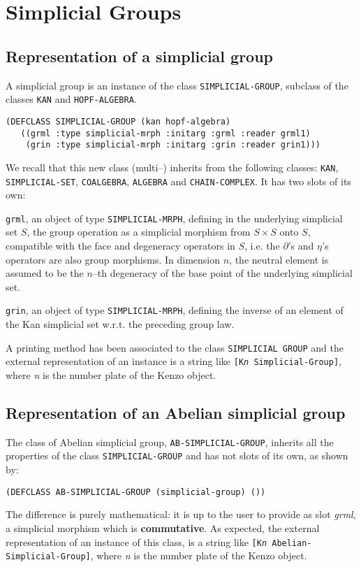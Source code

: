 \chapter {Simplicial Groups}

\section {Representation of a  simplicial group}

A simplicial group is  an instance 
of the class {\tt SIMPLICIAL-GROUP}, subclass of the classes {\tt KAN} and {\tt HOPF-ALGEBRA}.
{\footnotesize\begin{verbatim}
(DEFCLASS SIMPLICIAL-GROUP (kan hopf-algebra)
   ((grml :type simplicial-mrph :initarg :grml :reader grml1)
    (grin :type simplicial-mrph :initarg :grin :reader grin1)))
\end{verbatim}}
We recall that this new class (multi--) inherits  from the following classes:
{\tt KAN}, {\tt SIMPLICIAL-SET}, {\tt COALGEBRA},  {\tt ALGEBRA} and {\tt CHAIN-COMPLEX}.
It has two slots of its own:
\begin{description}
\item {\tt grml}, an object of type {\tt SIMPLICIAL-MRPH}, defining in the underlying simplicial set $S$, 
the group operation  as a simplicial morphism from $S \times S$ onto $S$,  
compatible with the face and degeneracy operators in $S$, i.e. the $\partial$'s and $\eta$'s operators are
also group morphisms. In dimension $n$, the neutral element is assumed to be the $n$--th degeneracy of
the base point of the underlying simplicial set.
\item {\tt grin}, an object of type {\tt SIMPLICIAL-MRPH}, defining the inverse of an element of the
Kan simplicial set w.r.t. the preceding group law. 
\end{description}
A printing method has been associated to the class {\tt SIMPLICIAL GROUP} and the external representation
of  an instance is a string like {\tt [K{\em n} Simplicial-Group]}, where {\em n} is the number plate of
the Kenzo object.

\section {Representation of an Abelian  simplicial group}

The class of Abelian simplicial group, {\tt AB-SIMPLICIAL-GROUP}, 
inherits  all the properties of the class {\tt SIMPLICIAL-GROUP} and has not slots of its own, as shown by:
{\footnotesize\begin{verbatim}
(DEFCLASS AB-SIMPLICIAL-GROUP (simplicial-group) ())
\end{verbatim}}
The difference is purely mathematical: it is up to the user to provide as slot
{\em grml}, a simplicial morphism which is {\bf commutative}. As expected, 
the external representation of  an instance of this class, is a string like 
{\tt [K{\em n} Abelian-Simplicial-Group]}, where {\em n} is the number plate of
the Kenzo object.


